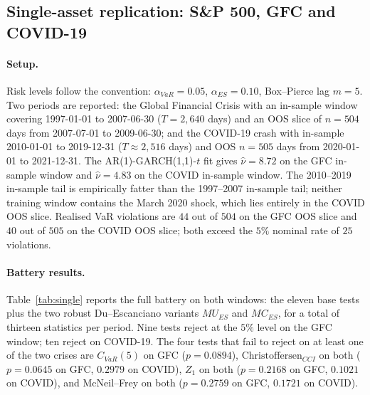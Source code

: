\documentclass[11pt,a4paper]{article}
\theoremstyle{plain}
\begin{document}
\subsection{Single-asset replication: S\&P 500, GFC and COVID-19}
\label{sec:res-single}

\paragraph{Setup.} Risk levels follow the \citet{du_escanciano_2017}
convention: $\alpha_{VaR} = 0.05$, $\alpha_{ES} = 0.10$, Box--Pierce
lag $m = 5$. Two periods are reported: the Global Financial Crisis
with an in-sample window covering 1997-01-01 to 2007-06-30 ($T = 2{,}640$
days) and an OOS slice of $n = 504$ days from 2007-07-01 to 2009-06-30;
and the COVID-19 crash with in-sample 2010-01-01 to 2019-12-31
($T \approx 2{,}516$ days) and OOS $n = 505$ days from 2020-01-01 to
2021-12-31. The AR(1)-GARCH(1,1)-$t$ fit gives
$\hat\nu = 8.72$ on the GFC in-sample window and $\hat\nu = 4.83$ on the
COVID in-sample window. The 2010--2019 in-sample tail is empirically
fatter than the 1997--2007 in-sample tail; neither training window
contains the March 2020 shock, which lies entirely in the COVID OOS
slice. Realised VaR violations are $44$ out of $504$ on the GFC OOS
slice and $40$ out of $505$ on the COVID OOS slice; both exceed the
$5\%$ nominal rate of $25$ violations.

\paragraph{Battery results.} Table~\ref{tab:single} reports the full
battery on both windows: the eleven base tests plus the two robust
Du--Escanciano variants $MU_{ES}$ and $MC_{ES}$, for a total of
thirteen statistics per period. Nine tests reject at the
$5\%$ level on the GFC window; ten reject on COVID-19. The four
tests that fail to reject on at least one of the two crises are
$C_{VaR}(5)$ on GFC ($p = 0.0894$), $\mathrm{Christoffersen}_{CCI}$
on both ($p = 0.0645$ on GFC, $0.2979$ on COVID), $Z_1$ on both
($p = 0.2168$ on GFC, $0.1021$ on COVID), and McNeil--Frey on both
($p = 0.2759$ on GFC, $0.1721$ on COVID).
\end{document}
